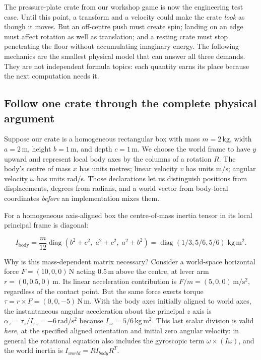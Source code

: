 \hypertarget{06-engine-ii-ch034-rigid-body-state-center-of-mass-mass-and-inverse-mass-newtonian-force-accumulation-gravity-drag-springs-damping-torque-angular-momentum-inertia-tensors-principal-axes-shape-inertia-parallel-axis-theorem-composite-bodies-and-world-space-inverse-inertia}{}

The pressure-plate crate from our workshop game is now the engineering test case. Until this point, a transform and a velocity could make the crate \emph{look} as though it moves. But an off-centre push must create spin; landing on an edge must affect rotation as well as translation; and a resting crate must stop penetrating the floor without accumulating imaginary energy. The following mechanics are the smallest physical model that can answer all three demands. They are not independent formula topics: each quantity earns its place because the next computation needs it.

\subsection{Follow one crate through the complete physical argument}\label{06-engine-ii-ch034-follow-one-crate-through-the-complete-physical-argument}

\hypertarget{06-engine-ii-ch034-follow-one-crate-through-the-complete-physical-argument}{}

Suppose our crate is a homogeneous rectangular box with mass \(m=2\,\mathrm{kg}\), width \(a=2\,\mathrm m\), height \(b=1\,\mathrm m\), and depth \(c=1\,\mathrm m\). We choose the world frame to have \(y\) upward and represent local body axes by the columns of a rotation \(R\). The body's centre of mass \(x\) has units metres; linear velocity \(v\) has units m/s; angular velocity \(\omega\) has units rad/s. Those declarations let us distinguish positions from displacements, degrees from radians, and a world vector from body-local coordinates \emph{before} an implementation mixes them.

For a homogeneous axis-aligned box the centre-of-mass inertia tensor in its local principal frame is diagonal:

\[
I_{\mathrm{body}}=\frac{m}{12}\operatorname{diag}(b^2+c^2,\;a^2+c^2,\;a^2+b^2)=\operatorname{diag}(1/3,5/6,5/6)\;\mathrm{kg\,m^2}.
\]

Why is this mass-dependent matrix necessary? Consider a world-space horizontal force \(F=(10,0,0)\,\mathrm N\) acting \(0.5\,\mathrm m\) above the centre, at lever arm \(r=(0,0.5,0)\,\mathrm m\). Its linear acceleration contribution is \(F/m=(5,0,0)\,\mathrm{m/s^2}\), regardless of the contact point. But the same force exerts torque \(\tau=r\times F=(0,0,-5)\,\mathrm{N\,m}\). With the body axes initially aligned to world axes, the instantaneous angular acceleration about the principal \(z\) axis is \(\alpha_z=\tau_z/I_{zz}=-6\,\mathrm{rad/s^2}\) because \(I_{zz}=5/6\,\mathrm{kg\,m^2}\). This last scalar division is valid \emph{here}, at the specified aligned orientation and initial zero angular velocity: in general the rotational equation also includes the gyroscopic term \(\omega\times(I\omega)\), and the world inertia is \(I_{world}=R I_{body}R^T\).

